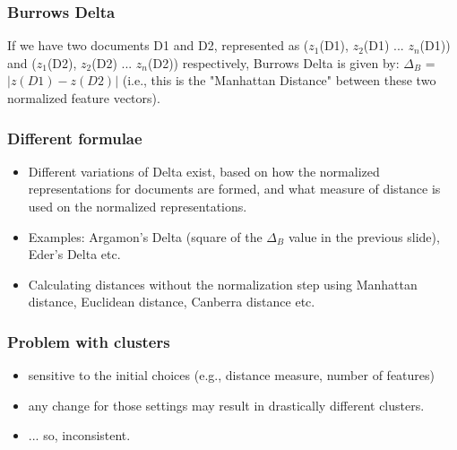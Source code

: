 \documentclass{beamer}
\begin{document}
\begin{frame}
\frametitle{Burrows Delta}
If we have two documents D1 and D2, represented as ($z_1$(D1), $z_2$(D1) ... $z_n$(D1)) and ($z_1$(D2), $z_2$(D2) ... $z_n$(D2)) respectively, Burrows Delta is given by:
$\Delta_B$ = $|z(D1) -z(D2)|$ (i.e., this is the "Manhattan Distance" between these two normalized feature vectors).
\end{frame}

\begin{frame}
\frametitle{Different formulae}
\begin{itemize}
\item Different variations of Delta exist, based on how the normalized representations for documents are formed, and what measure of distance is used on the normalized representations. 
\item Examples: Argamon's Delta (square of the $\Delta_B$ value in the previous slide), Eder's Delta etc.
\item Calculating distances without the normalization step using Manhattan distance, Euclidean distance, Canberra distance etc.
\end{itemize}
\end{frame}

\begin{frame}
\frametitle{Problem with clusters}
\begin{itemize}
\item sensitive to the initial choices (e.g., distance measure, number of features)
\item any change for those settings may result in drastically different clusters.
\item ... so, inconsistent.
\end{itemize}
\end{frame}
\end{document}

